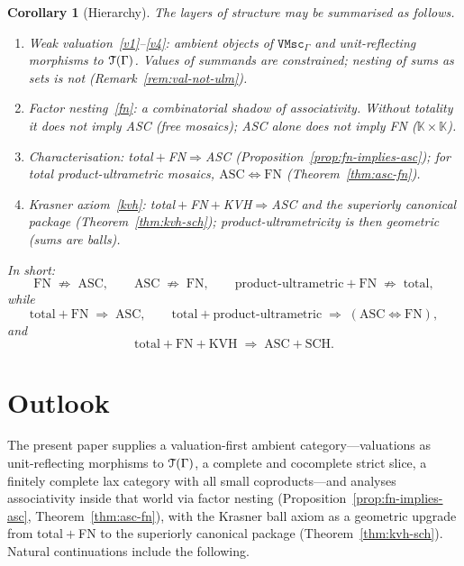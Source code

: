\documentclass[11pt]{amsart}
\theoremstyle{plain}
\newtheorem{corollary}[theorem]{Corollary}
\theoremstyle{definition}
\theoremstyle{remark}
\newcommand{\T}{\EuScript{T}}
\newcommand{\VMscG}{\mathtt{VMsc}_{\Gamma}}
\begin{document}
\begin{corollary}[Hierarchy]
\label{cor:hierarchy}
The layers of structure may be summarised as follows.
\begin{enumerate}[label=(\alph*)]
\item\label{hier-weak} \emph{Weak valuation}~\eqref{v1}--\eqref{v4}: ambient objects of \(\VMscG\) and unit-reflecting morphisms to \(\T(\Gamma)\). Values of summands are constrained; nesting of sums as sets is not (Remark~\ref{rem:val-not-ulm}).
\item\label{hier-fn} \emph{Factor nesting}~\eqref{fn}: a combinatorial shadow of associativity. Without totality it does not imply ASC (free mosaics); ASC alone does not imply FN (\(\mathbb{K}\times\mathbb{K}\)).
\item\label{hier-char} \emph{Characterisation:} total\({}+{}\)FN\(\Rightarrow\)ASC (Proposition~\ref{prop:fn-implies-asc}); for total product-ultrametric mosaics, \(\mathrm{ASC}\Leftrightarrow\mathrm{FN}\) (Theorem~\ref{thm:asc-fn}).
\item\label{hier-kvh} \emph{Krasner axiom}~\eqref{kvh}: total\({}+{}\)FN\({}+{}\)KVH\(\Rightarrow\)ASC and the superiorly canonical package (Theorem~\ref{thm:kvh-sch}); product-ultrametricity is then geometric (sums are balls).
\end{enumerate}
In short:
\[
\text{FN}\;\not\Rightarrow\;\text{ASC},
\qquad
\text{ASC}\;\not\Rightarrow\;\text{FN},
\qquad
\text{product-ultrametric}+\text{FN}\;\not\Rightarrow\;\text{total},
\]
while
\[
\text{total}+\text{FN}\;\Rightarrow\;\text{ASC},
\qquad
\text{total}+\text{product-ultrametric}\;\Rightarrow\;(\mathrm{ASC}\Leftrightarrow\mathrm{FN}),
\]
and
\[
\text{total}+\text{FN}+\text{KVH}\;\Rightarrow\;\text{ASC}+\text{SCH}.
\]
\end{corollary}

\section{Outlook}
\label{sec:outlook}

The present paper supplies a valuation-first ambient category---valuations as unit-reflecting morphisms to \(\T(\Gamma)\), a complete and cocomplete strict slice, a finitely complete lax category with all small coproducts---and analyses associativity inside that world via factor nesting (Proposition~\ref{prop:fn-implies-asc}, Theorem~\ref{thm:asc-fn}), with the Krasner ball axiom as a geometric upgrade from total\({}+{}\)FN to the superiorly canonical package (Theorem~\ref{thm:kvh-sch}). Natural continuations include the following.
\end{document}
